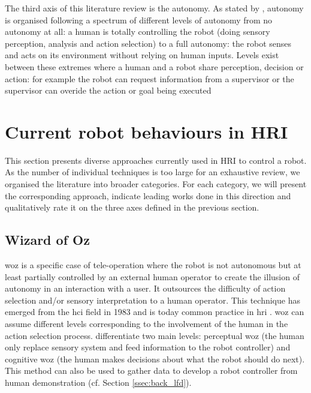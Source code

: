     The third axis of this literature review is the autonomy. As stated by \citet{beer2014toward}, autonomy is organised following a spectrum of different levels of autonomy from no autonomy at all: a human is totally controlling the robot (doing sensory perception, analysis and action selection) to a full autonomy: the robot senses and acts on its environment without relying on human inputs. Levels exist between these extremes where a human and a robot share perception, decision or action: for example the robot can request information from a supervisor or the supervisor can overide the action or goal being executed
    

\section{Current robot behaviours in HRI} \label{sec:back_behaviour}

    This section presents diverse approaches currently used in HRI to control a robot. As the number of individual techniques is too large for an exhaustive review, we organised the literature into broader categories. For each category, we will present the corresponding approach, indicate leading works done in this direction and qualitatively rate it on the three axes defined in the previous section.

\subsection{Wizard of Oz} \label{subsec:WoZ}

	\acrfull{woz} is a specific case of tele-operation where the robot is not autonomous but at least partially controlled by an external human operator to create the illusion of autonomy in an interaction with a user. It outsources the difficulty of action selection and/or sensory interpretation to a human operator. This technique has emerged from the \gls{hci} field in 1983 \citep{kelley1983empirical} and is today common practice in \gls{hri} \citep{riek2012wizard}. \gls{woz} can assume different levels corresponding to the involvement of the human in the action selection process. \cite{baxter2016characterising} differentiate two main levels: perceptual \gls{woz} (the human only replace sensory system and feed information to the robot controller) and cognitive \gls{woz} (the human makes decisions about what the robot should do next). This method can also be used to gather data to develop a robot controller from human demonstration (cf. Section \ref{ssec:back_lfd}).
 
